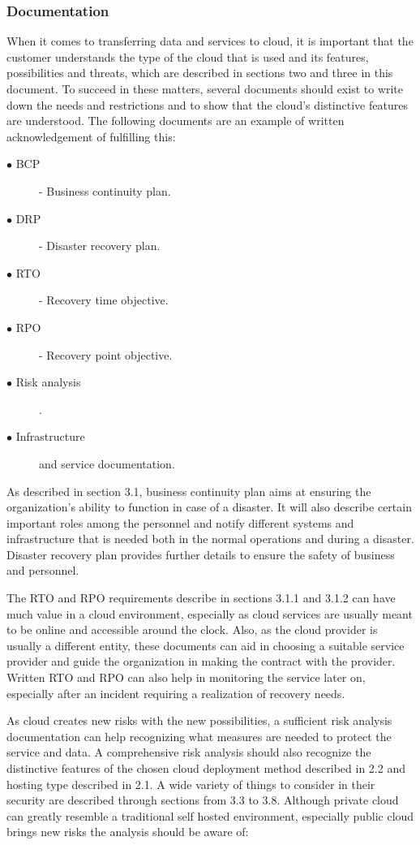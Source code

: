 \documentclass{article}
\begin{document}
\subsubsection{Documentation}
When it comes to transferring data and services to cloud, it is important that the customer understands the type of the cloud that is used and its features, possibilities and threats, which are described in sections two and three in this document. To succeed in these matters, several documents should exist to write down the needs and restrictions and to show that the cloud's distinctive features are understood. The following documents are an example of written acknowledgement of fulfilling this:
\begin{description}
	\item[$\bullet$ BCP] - Business continuity plan.
	\item[$\bullet$ DRP] - Disaster recovery plan.
	\item[$\bullet$ RTO] - Recovery time objective.
	\item[$\bullet$ RPO] - Recovery point objective.
	\item[$\bullet$ Risk analysis].
	\item[$\bullet$ Infrastructure] and service documentation.
\end{description}
\par
As described in section 3.1, business continuity plan aims at ensuring the organization's ability to function in case of a disaster. It will also describe certain important roles among the personnel and notify different systems and infrastructure that is needed both in the normal operations and during a disaster. Disaster recovery plan provides further details to ensure the safety of business and personnel.
\par
The RTO and RPO requirements describe in sections 3.1.1 and 3.1.2 can have much value in a cloud environment, especially as cloud services are usually meant to be online and accessible around the clock. Also, as the cloud provider is usually a different entity, these documents can aid in choosing a suitable service provider and guide the organization in making the contract with the provider. Written RTO and RPO can also help in monitoring the service later on, especially after an incident requiring a realization of recovery needs.
\par
As cloud creates new risks with the new possibilities, a sufficient risk analysis documentation can help recognizing what measures are needed to protect the service and data. A comprehensive risk analysis should also recognize the distinctive features of the chosen cloud deployment method described in 2.2 and hosting type described in 2.1. A wide variety of things to consider in their security are described through sections from 3.3 to 3.8. Although private cloud can greatly resemble a traditional self hosted environment, especially public cloud brings new risks the analysis should be aware of:
\end{document}
